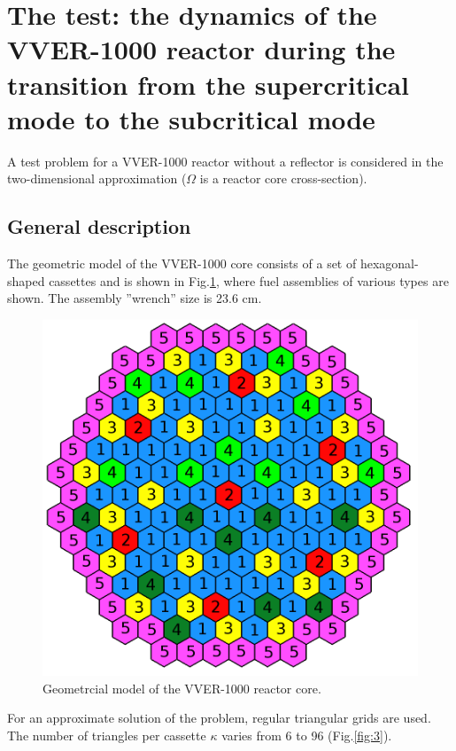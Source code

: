 \documentclass[authoryear]{elsarticle}
\begin{document}
\section{The test: the dynamics of the VVER-1000 reactor during the transition from the supercritical mode to the subcritical mode} 

A test problem for a VVER-1000 reactor without a reflector  \cite{chao} 
is considered in the two-dimensional approximation ($\Omega$ is a reactor core cross-section). 

\subsection{General description} 

The geometric model of the VVER-1000 core consists of a set of hexagonal-shaped cassettes and is shown in Fig.\ref{fig:2}, where fuel assemblies of various types are shown. The assembly ''wrench''  size is 23.6 cm.

\begin{figure}[!h]
  \begin{center}
    \includegraphics[width=0.75\linewidth] {2.png}
	\caption{Geometrcial model of the VVER-1000 reactor core.}
	\label{fig:2}
  \end{center}
\end{figure} 

For an approximate solution of the problem, regular triangular grids are used. The number of triangles per cassette $\kappa$  varies from 6 to 96 (Fig.\ref{fig:3}). 
\end{document}
